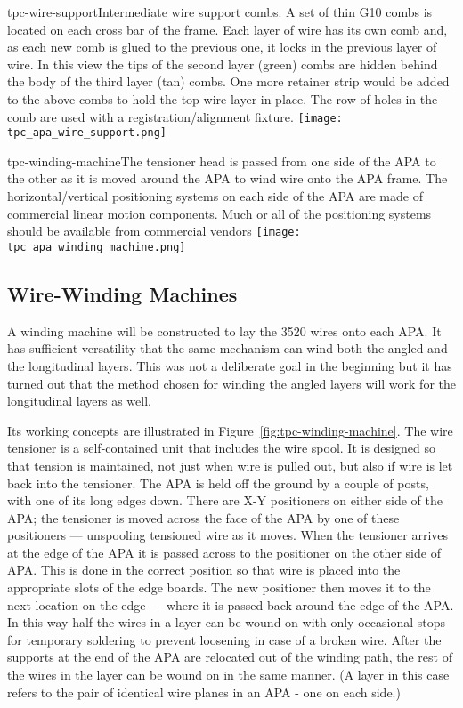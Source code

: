 \begin{cdrfigure}{tpc-wire-support}{Intermediate wire support combs.  A set of thin G10 combs is located on each cross bar of the frame.  Each layer of wire has its own comb and, as each new comb is glued to the previous one, it locks in the previous layer of wire.  In this view the tips of the second layer (green) combs are hidden behind the body of the third layer (tan) combs.  One more retainer strip would be added to the above combs to hold the top wire layer in place.  The row of holes in the comb are used with a registration/alignment fixture.}
\texttt{[image: tpc\_apa\_wire\_support.png]}
\end{cdrfigure}


\begin{cdrfigure}{tpc-winding-machine}{The tensioner head is passed from one side of the APA to the other as it is moved around the APA to wind wire onto the APA frame.  The horizontal/vertical positioning systems on each side of the APA are made of commercial linear motion components.  Much or all of the positioning systems should be available from commercial vendors}
\texttt{[image: tpc\_apa\_winding\_machine.png]}
\end{cdrfigure}


\subsection{Wire-Winding Machines}

A winding machine will be constructed to lay the 3520 wires onto each APA. It has sufficient versatility that the same mechanism can wind both the angled and the longitudinal layers.  This was not a deliberate goal in the beginning but it has turned out that the method chosen for winding the angled layers will work for the longitudinal layers as well.
 
Its working concepts are illustrated in Figure~\ref{fig:tpc-winding-machine}. 
The wire tensioner is a self-contained unit that includes the wire spool. It is designed so that tension is maintained, not just when wire is pulled out, but also if wire is let back into the tensioner. The APA is held off the ground by a couple of posts, with one of its long edges down. There are X-Y positioners on either side of the APA; the tensioner is moved across the face of the APA by one of these positioners --- unspooling tensioned wire as it moves. When the tensioner arrives at the edge of the APA it is passed across to the positioner on the other side of APA. This is done in the correct position so that wire is placed into the appropriate slots of the edge boards. The new positioner then moves it to the next location on the edge --- where it is passed back around the edge of the APA. In this way half the wires in a layer can be wound on with only occasional stops for temporary soldering to prevent loosening in case of a broken wire.  After the supports at the end of the APA are relocated out of the winding path, the rest of the wires in the layer can be wound on in the same manner.  (A layer in this case refers to the pair of identical wire planes in an APA - one on each side.)

